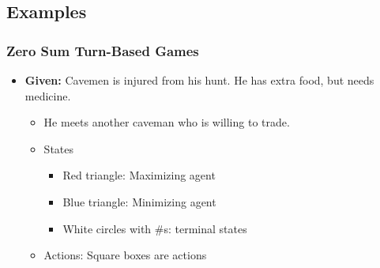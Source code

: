 \subsection{Examples}
\subsubsection{Zero Sum Turn-Based Games}
\begin{example}
    \begin{itemize}
        \item \textbf{Given:} Cavemen is injured from his hunt. He has extra food, but needs medicine.
        \begin{itemize}
            \item He meets another caveman who is willing to trade. 
        \end{itemize} 
        \vspace{-1.5em}
        \begin{itemize}
            \item States
            \begin{itemize}
                \item Red triangle: Maximizing agent
                \item Blue triangle: Minimizing agent
                \item White circles with \#s: terminal states
            \end{itemize}
            \item Actions: Square boxes are actions
        \end{itemize}
        \vspace{-1.5em}
    \end{itemize}
\end{example}

